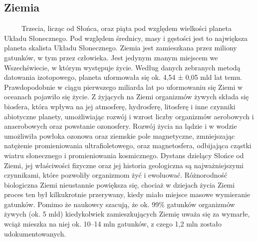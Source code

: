 \documentclass[12pt, letterpaper, titlepage]{article}
\begin{document}
\subsection{Ziemia}
\ \ \ \ \ Trzecia, licząc od Słońca, oraz piąta pod względem wielkości planeta Układu Słonecznego. Pod względem średnicy, masy i gęstości jest to największa planeta skalista Układu Słonecznego. Ziemia jest zamieszkana przez miliony gatunków, w tym przez człowieka. Jest jedynym znanym miejscem we Wszechświecie, w którym występuje życie. Według danych zebranych metodą datowania izotopowego, planeta uformowała się ok. 4,54 ± 0,05 mld lat temu.
 Prawdopodobnie w ciągu pierwszego miliarda lat po uformowaniu się Ziemi w oceanach pojawiło się życie. Z żyjących na Ziemi organizmów żywych składa się biosfera, która wpływa na jej atmosferę, hydrosferę, litosferę i inne czynniki abiotyczne planety, umożliwiając rozwój i wzrost liczby organizmów aerobowych i anaerobowych oraz powstanie ozonosfery. Rozwój życia na lądzie i w wodzie umożliwiła powłoka ozonowa oraz ziemskie pole magnetyczne, zmniejszając natężenie promieniowania ultrafioletowego, oraz magnetosfera, odbijająca cząstki wiatru słonecznego i promieniowania kosmicznego. \newline
 \newline Dystans dzielący Słońce od Ziemi, jej właściwości fizyczne oraz jej historia geologiczna są najważniejszymi czynnikami, które pozwoliły organizmom żyć i ewoluować. Różnorodność biologiczna Ziemi nieustannie powiększa się, chociaż w dziejach życia Ziemi proces ten był kilkukrotnie przerywany, kiedy miało miejsce masowe wymieranie gatunków. Pomimo że naukowcy szacują, że ok. 99\% gatunków organizmów żywych (ok. 5 mld) kiedykolwiek zamieszkujących Ziemię uważa się za wymarłe, wciąż mieszka na niej ok. 10–14 mln gatunków, z czego 1,2 mln zostało udokumentowanych. \newline
\end{document}
